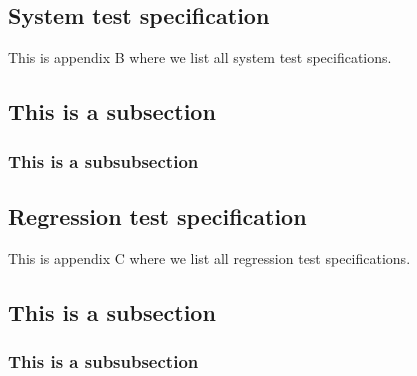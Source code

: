 \documentclass[a4paper]{article}
\begin{document}
\newpage
\begin{appendices}

\section{System test specification} \label{appendix:section:systemtest}
This is appendix B where we list all system test specifications.

\subsection{This is a subsection}

\subsubsection{This is a subsubsection}

\end{appendices}

\newpage
\begin{appendices}
\section{Regression test specification}
This is appendix C where we list all regression test specifications.

\subsection{This is a subsection}

\subsubsection{This is a subsubsection}
\end{appendices}
\end{document}
